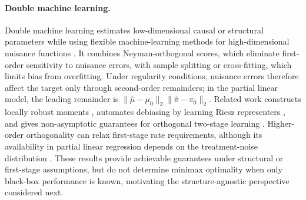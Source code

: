 \documentclass[11pt]{article}
\begin{document}
\paragraph{Double machine learning.}
Double machine learning estimates low-dimensional causal or structural
parameters while using flexible machine-learning methods for high-dimensional
nuisance functions \citep{chernozhukov2018double}. It combines
Neyman-orthogonal scores, which eliminate first-order sensitivity to nuisance
errors, with sample splitting or cross-fitting, which limits bias from
overfitting. Under regularity conditions, nuisance errors therefore affect
the target only through second-order remainders; in the partial linear model,
the leading remainder is
$\|\widehat\mu-\mu_0\|_2\|\widehat\pi-\pi_0\|_2$. Related work constructs
locally robust moments \citep{chernozhukov2022locally}, automates debiasing by
learning Riesz representers \citep{chernozhukov2022automatic}, and gives
non-asymptotic guarantees for orthogonal two-stage learning
\citep{foster2023orthogonalstatisticallearning}. Higher-order orthogonality
can relax first-stage rate requirements, although its availability in partial
linear regression depends on the treatment-noise distribution
\citep{mackey2018orthogonal}. These results provide achievable guarantees
under structural or first-stage assumptions, but do not determine minimax
optimality when only black-box performance is known, motivating the
structure-agnostic perspective considered next.
\end{document}

